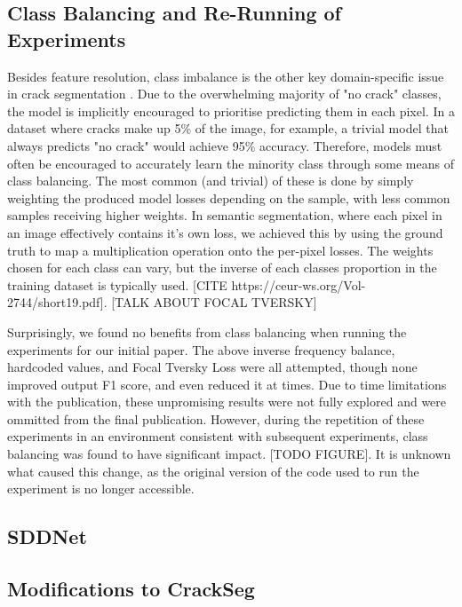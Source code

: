 \documentclass[a4paper,12pt]{report}
\begin{document}
    \subsection{Class Balancing and Re-Running of Experiments}
    Besides feature resolution, class imbalance is the other key domain-specific issue in crack segmentation \cite{hamishebahar_comprehensive_2022}. Due to the overwhelming majority of "no crack" classes, the model is implicitly encouraged to prioritise predicting them in each pixel. In a dataset where cracks make up 5\% of the image, for example, a trivial model that always predicts "no crack" would achieve 95\% accuracy. Therefore, models must often be encouraged to accurately learn the minority class through some means of class balancing. The most common (and trivial) of these is done by simply weighting the produced model losses depending on the sample, with less common samples receiving higher weights. In semantic segmentation, where each pixel in an image effectively contains it's own loss, we achieved this by using the ground truth to map a multiplication operation onto the per-pixel losses. The weights chosen for each class can vary, but the inverse of each classes proportion in the training dataset is typically used. [CITE https://ceur-ws.org/Vol-2744/short19.pdf]. [TALK ABOUT FOCAL TVERSKY]

    Surprisingly, we found no benefits from class balancing when running the experiments for our initial paper. The above inverse frequency balance, hardcoded values, and Focal Tversky Loss were all attempted, though none improved output F1 score, and even reduced it at times. Due to time limitations with the publication, these unpromising results were not fully explored and were ommitted from the final publication. However, during the repetition of these experiments in an environment consistent with subsequent experiments, class balancing was found to have significant impact. [TODO FIGURE]. It is unknown what caused this change, as the original version of the code used to run the experiment is no longer accessible.

    
    \subsection{SDDNet}


    \subsection{Modifications to CrackSeg}
\end{document}
